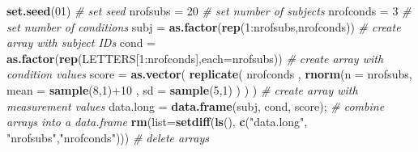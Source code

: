 \documentclass[]{article}
\newenvironment{Shaded}{\begin{snugshade}}{\end{snugshade}}
\newcommand{\KeywordTok}[1]{\textcolor[rgb]{0.13,0.29,0.53}{\textbf{{#1}}}}
\newcommand{\DataTypeTok}[1]{\textcolor[rgb]{0.13,0.29,0.53}{{#1}}}
\newcommand{\DecValTok}[1]{\textcolor[rgb]{0.00,0.00,0.81}{{#1}}}
\newcommand{\StringTok}[1]{\textcolor[rgb]{0.31,0.60,0.02}{{#1}}}
\newcommand{\CommentTok}[1]{\textcolor[rgb]{0.56,0.35,0.01}{\textit{{#1}}}}
\newcommand{\NormalTok}[1]{{#1}}
\begin{document}
\begin{Shaded}
\begin{Highlighting}[]
\KeywordTok{set.seed}\NormalTok{(}\DecValTok{01}\NormalTok{)   }\CommentTok{# set seed}
\NormalTok{nrofsubs  =}\StringTok{ }\DecValTok{20} \CommentTok{# set number of subjects}
\NormalTok{nrofconds =}\StringTok{ }\DecValTok{3}  \CommentTok{# set number of conditions}
\NormalTok{subj =}\StringTok{ }\KeywordTok{as.factor}\NormalTok{(}\KeywordTok{rep}\NormalTok{(}\DecValTok{1}\NormalTok{:nrofsubs,nrofconds))      }\CommentTok{# create array with subject IDs}
\NormalTok{cond =}\StringTok{ }\KeywordTok{as.factor}\NormalTok{(}\KeywordTok{rep}\NormalTok{(LETTERS[}\DecValTok{1}\NormalTok{:nrofconds],}\DataTypeTok{each=}\NormalTok{nrofsubs))   }\CommentTok{# create array with condition values}
\NormalTok{score =}\StringTok{ }\KeywordTok{as.vector}\NormalTok{( }\KeywordTok{replicate}\NormalTok{(}
          \NormalTok{nrofconds , }\KeywordTok{rnorm}\NormalTok{(}\DataTypeTok{n =} \NormalTok{nrofsubs, }\DataTypeTok{mean =} \KeywordTok{sample}\NormalTok{(}\DecValTok{8}\NormalTok{,}\DecValTok{1}\NormalTok{)+}\DecValTok{10} \NormalTok{, }\DataTypeTok{sd =} \KeywordTok{sample}\NormalTok{(}\DecValTok{5}\NormalTok{,}\DecValTok{1}\NormalTok{) ) }
        \NormalTok{) )                                     }\CommentTok{# create array with measurement values}
\NormalTok{data.long =}\StringTok{ }\KeywordTok{data.frame}\NormalTok{(subj, cond, score);      }\CommentTok{# combine arrays into a data.frame}
\KeywordTok{rm}\NormalTok{(}\DataTypeTok{list=}\KeywordTok{setdiff}\NormalTok{(}\KeywordTok{ls}\NormalTok{(), }\KeywordTok{c}\NormalTok{(}\StringTok{"data.long"}\NormalTok{, }\StringTok{"nrofsubs"}\NormalTok{,}\StringTok{"nrofconds"}\NormalTok{))) }\CommentTok{# delete arrays}
\end{Highlighting}
\end{Shaded}
\end{document}
